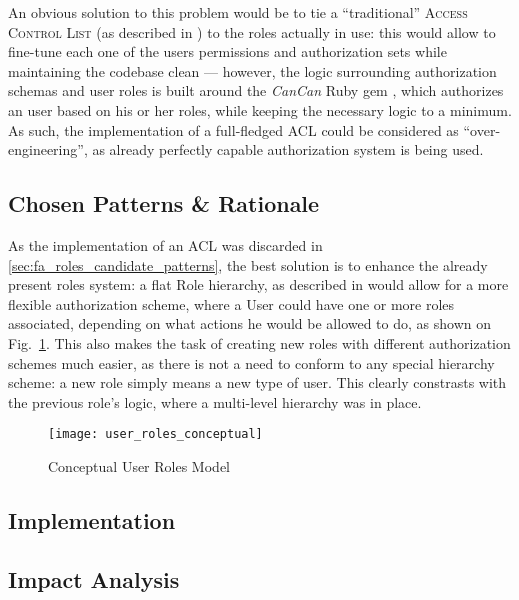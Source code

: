 An obvious solution to this problem would be to tie a ``traditional'' \textsc{Access Control List} (as described in \cite{}) to the roles actually in use: this would allow to fine-tune each one of the users permissions and authorization sets while maintaining the codebase clean --- however, the logic surrounding authorization schemas and user roles is built around the \emph{CanCan} Ruby gem \cite{cancan}, which authorizes an user based on his or her roles, while keeping the necessary logic to a minimum. As such, the implementation of a full-fledged ACL could be considered as ``over-engineering'', as already perfectly capable authorization system is being used.

\subsection{Chosen Patterns \& Rationale}\label{sec:fa_roles_chosen_patterns_rationale}

As the implementation of an ACL was discarded in \ref{sec:fa_roles_candidate_patterns}, the best solution is to enhance the already present roles system: a flat Role hierarchy, as described in \cite{baumer_riehle_role_object} would allow for a more flexible authorization scheme, where a User could have one or more roles associated, depending on what actions he would be allowed to do, as shown on Fig.~\ref{fig:user_roles_conceptual}. This also makes the task of creating new roles with different authorization schemes much easier, as there is not a need to conform to any special hierarchy scheme: a new role simply means a new type of user. This clearly constrasts with the previous role's logic, where a multi-level hierarchy was in place.

\begin{figure}[H]
  \centering
  \texttt{[image: user\_roles\_conceptual]}
  \caption{Conceptual User Roles Model}
  \label{fig:user_roles_conceptual}
\end{figure}

\subsection{Implementation}\label{sec:fa_roles_implementation}

\subsection{Impact Analysis}\label{sec:fa_roles_impact_analysis}
